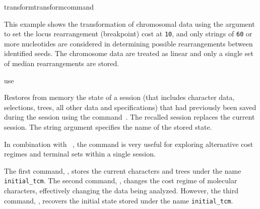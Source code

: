 \begin{command}{transform}{transformcommand}
\begin{poyexamples}
             	{This example shows the transformation of chromosomal data using the argument 
		to set the locus rearrangement (breakpoint) cost at \texttt{10}, and only strings of \texttt{60} or more nucleotides 
		are considered in determining possible rearrangements between identified seeds.  The chromosome data are
		treated as linear and only a single set of median rearrangements are stored.}
            
	\end{poyexamples}	    

\end{command}


\begin{command}{use}{}

	\syntax{\obligatory{(\poystring)}}

	\begin{poydescription}
         Restores from memory the state of a \poy session (that includes character data,
         selections, trees, all other data and specifications) that had previously been
         saved during the session using the command~. The recalled
         session replaces the current session. The string argument specifies the name
         of the stored state.
         
         In combination with ~, the command 
         is very useful for exploring alternative  cost regimes and terminal sets
         within a single \poy session.
            
	\end{poydescription}
	
	\begin{poyexamples}
            {The first command, , stores the current
            characters and trees under the
            name \texttt{initial\_tcm}. The second command,
            , changes the cost regime of molecular characters,
            effectively changing the data being analyzed. However, the third
            command, , recovers the initial state stored under the
            name \texttt{initial\_tcm}.}
    \end{poyexamples}

     \begin{poyalso}
    \end{poyalso}

\end{command}

